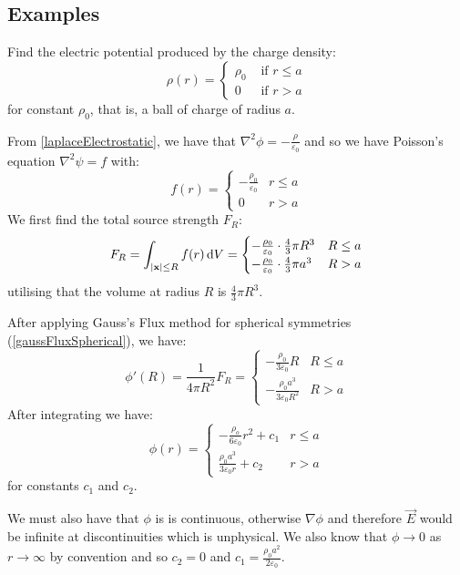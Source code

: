 \documentclass[../main.tex]{subfiles}
\begin{document}
\subsection{Examples}
\begin{example}
  \label{chargedBall}
  Find the electric potential produced by the charge density:
  \[
    \rho(r) = \begin{cases}
    \rho_0 & \text{ if } r\leq a \\
    0 & \text{ if } r > a
    \end{cases}
  \]
  for constant $\rho_0$, that is, a ball of charge of radius $a$.

  From \cref{laplaceElectrostatic}, we have that $\nabla^2 \phi = - \frac{\rho}{\varepsilon_0}$ and so we have Poisson's equation $\nabla^2 \psi = f$ with:
  \[
    f(r) = \begin{cases}
    -\frac{\rho_0}{\varepsilon_0} & r \leq a \\
    0 & r > a
    \end{cases}
  \]
  We first find the total source strength $F_R$:
  \[
    F_R = \int_{|\vec{x}| \leq R} f(r) \d{V} = \begin{cases}
    - \frac{\rho_0}{\varepsilon_0} \cdot \frac{4}{3} \pi R^3 &  R \leq a \\
    - \frac{\rho_0}{\varepsilon_0} \cdot \frac{4}{3} \pi a^3 &  R > a
    \end{cases}
  \]
  utilising that the volume at radius $R$ is $\frac{4}{3} \pi R^3$.

  After applying Gauss's Flux method for spherical symmetries (\cref{gaussFluxSpherical}), we have:
  \[
    \phi'(R) = \frac{1}{4\pi R^2}F_R =\begin{cases}
    - \frac{\rho_0}{3 \varepsilon_0}R & R \leq a \\
    - \frac{\rho_0 a^3}{3 \varepsilon_0 R^2} & R > a
    \end{cases}
  \]
  After integrating we have:
  \[
    \phi(r) = \begin{cases}
    - \frac{\rho_o}{6\varepsilon_0} r^2 + c_1 &  r \leq a \\
    \frac{\rho_0 a^3}{3 \varepsilon_0 r} + c_2 & r > a
    \end{cases}
  \]
  for constants $c_1$ and $c_2$.

  We must also have that $\phi$ is is continuous, otherwise $\nabla \phi$ and therefore $\vec{E}$ would be infinite at discontinuities which is unphysical.
  We also know that $\phi \to 0$ as $r \to \infty$ by convention and so $c_2 = 0$ and $c_1 = \frac{\rho_0 a^2}{2 \varepsilon_0}$.


\end{example}
\end{document}
